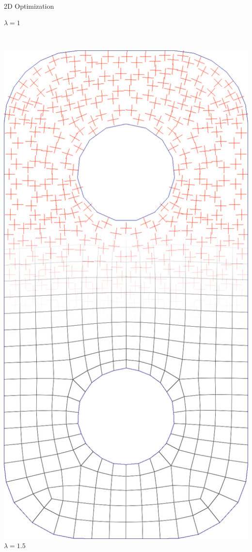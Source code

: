 \documentclass{beamer}
\begin{document}
\begin{frame}{2D Optimization}
\begin{minipage}[b]{0.15\textwidth}
        $\lambda = 1$
    \end{minipage}
    \ \ \ 
    \begin{minipage}[b]{0.15\textwidth}
        \centering
        \includegraphics[width=\textwidth]{img_spm_ff/perced_25}
        $\lambda = 1.5$
    \end{minipage}
\end{frame} 
\end{document}
